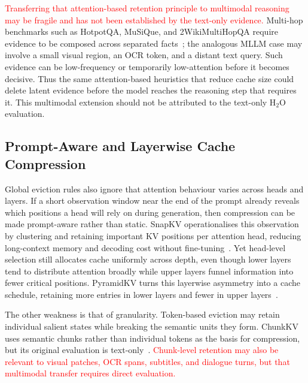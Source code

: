 \documentclass[10pt]{article}
\begin{document}
\textcolor{red}{Transferring that attention-based retention principle to multimodal
reasoning may be fragile and has not been established by the text-only evidence.}
Multi-hop benchmarks such as
HotpotQA, MuSiQue, and 2WikiMultiHopQA require evidence to be composed across separated
facts~\citep{yang2018hotpotqadatasetdiverseexplainable,trivedi2022musiquemultihopquestionssinglehop,ho2020constructingmultihopqadataset}; the analogous MLLM case may
involve a small visual region, an OCR token, and a distant text query.  Such evidence
can be low-frequency or temporarily low-attention before it becomes decisive.  Thus the
  same attention-based heuristics that reduce cache size could delete latent evidence
before the model reaches the reasoning step that requires it.  This multimodal
extension should not be attributed to the text-only H$_2$O evaluation.

\subsection{Prompt-Aware and Layerwise Cache Compression}

Global eviction rules also ignore that attention behaviour varies across heads and
layers.  If a short observation window near the end of the prompt already reveals which
positions a head will rely on during generation, then compression can be made
prompt-aware rather than static.  SnapKV operationalises this observation by clustering
and retaining important KV positions per attention head, reducing long-context memory
and decoding cost without fine-tuning~\citep{li2024snapkvllmknowslooking}.  Yet head-level selection still
allocates cache uniformly across depth, even though lower layers tend to distribute
attention broadly while upper layers funnel information into fewer critical positions.
PyramidKV turns this layerwise asymmetry into a cache schedule, retaining more entries
in lower layers and fewer in upper layers~\citep{cai2025pyramidkvdynamickvcache}.

The other weakness is that of granularity. Token-based eviction may retain individual
salient states while breaking the semantic units they form.  ChunkKV uses semantic
chunks rather than individual tokens as the basis for compression, but its original
evaluation is text-only~\citep{liu2025chunkkvsemanticpreservingkvcache}.
\textcolor{red}{Chunk-level retention may also be relevant to visual patches, OCR
spans, subtitles, and dialogue turns, but that multimodal transfer requires direct
evaluation.}
\end{document}
